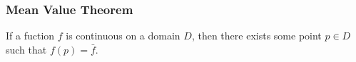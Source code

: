 \subsubsection{Mean Value Theorem}
\begin{theorem}
	If a fuction $f$ is continuous on a domain $D$, then there exists some point $p\in D$ such that $f(p)=\bar{f}$.
\end{theorem}